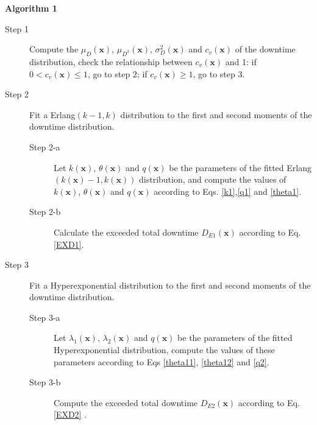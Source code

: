 \documentclass[preprint,12pt]{elsarticle}
\begin{document}
\textbf{Algorithm 1}
\label{Algorithm1}
\begin{description}
\item[Step 1] Compute the $\mu_{D}(\boldsymbol{x})$, $\mu_{D^{2}}(\boldsymbol{x})$, $\sigma^{2}_{D}(\boldsymbol{x})$ and $c_{v}(\boldsymbol{x})$ of the downtime distribution, check the relationship between $c_{v}(\boldsymbol{x})$ and 1: if $0<c_{v}(\boldsymbol{x}) \leq 1$, go to step 2; if $c_{v}(\boldsymbol{x}) \geq 1$, go to step 3.
\item[Step 2] Fit a Erlang$(k-1, k)$ distribution to the first and second moments of the downtime distribution.
 \begin{description}
 \item[Step 2-a] Let $k(\boldsymbol{x})$, $\theta(\boldsymbol{x})$ and $q(\boldsymbol{x})$ be the parameters of the fitted Erlang$(k(\boldsymbol{x})-1,k(\boldsymbol{x}))$ distribution, and compute the values of $k(\boldsymbol{x})$, $\theta(\boldsymbol{x})$ and $q(\boldsymbol{x})$ according to Eqs. \eqref{k1},\eqref{q1} and \eqref{theta1}.
 \item[Step 2-b] Calculate the exceeded total downtime $D_{E1}(\boldsymbol{x})$ according to Eq. \eqref{EXD1}.
\end{description}
\item[Step 3] Fit a Hyperexponential distribution to the first and second moments of the downtime distribution.

\begin{description}
 \item[Step 3-a] Let $\lambda_{1}(\boldsymbol{x})$, $\lambda_{2}(\boldsymbol{x})$ and $q(\boldsymbol{x})$ be the parameters of the fitted Hyperexponential distribution, compute the values of these parameters according to Eqs \eqref{theta11}, \eqref{theta12} and \eqref{q2}.
 \item[Step 3-b] Compute the exceeded total downtime $D_{E2}(\boldsymbol{x})$ according to Eq. \eqref{EXD2} .
\end{description}

\end{description}
\end{document}
